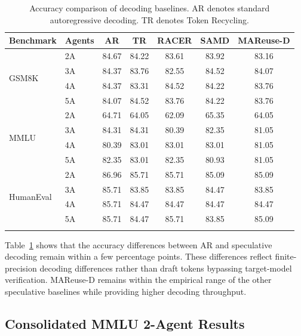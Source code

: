 \documentclass[letterpaper]{article} %
\newcommand{\thickhline}{\noalign{\hrule height 0.8pt}}
\begin{document}
\begin{table}[h]
\centering
\small
\setlength{\tabcolsep}{1.8pt}
\begin{tabular}{llccccc}
\thickhline
\textbf{Benchmark} & \textbf{Agents} & \textbf{AR} & \textbf{TR} & \textbf{RACER} & \textbf{SAMD} & \textbf{MAReuse-D} \\
\hline
\multirow{4}{*}{GSM8K}  & 2A & 84.67 & 84.22 & 83.61 & 83.92 & 83.16 \\
 & 3A & 84.37 & 83.76 & 82.55 & 84.52 & 84.07 \\
 & 4A & 84.37 & 83.31 & 84.52 & 84.22 & 83.76 \\
 & 5A & 84.07 & 84.52 & 83.76 & 84.22 & 83.76 \\
\hline
\multirow{4}{*}{MMLU} & 2A & 64.71 & 64.05 & 62.09 & 65.35 & 64.05 \\
 & 3A & 84.31 & 84.31 & 80.39 & 82.35 & 81.05 \\
 & 4A & 80.39 & 83.01 & 83.01 & 83.01 & 81.05 \\
 & 5A & 82.35 & 83.01 & 82.35 & 80.93 & 81.05 \\
\hline
\multirow{4}{*}{HumanEval} & 2A & 86.96 & 85.71 & 85.71 & 85.09 & 85.09 \\
 & 3A & 85.71 & 83.85 & 83.85 & 84.47 & 83.85 \\
 & 4A & 85.71 & 84.47 & 84.47 & 84.47 & 84.47 \\
 & 5A & 85.71 & 84.47 & 85.71 & 83.85 & 85.09 \\
\thickhline
\end{tabular}
\caption{Accuracy comparison of decoding baselines. AR denotes standard autoregressive decoding. TR denotes Token Recycling.}
\label{tab:decoding-accuracy-consistency}
\end{table}

Table~\ref{tab:decoding-accuracy-consistency} shows that the accuracy differences
between AR and speculative decoding remain within a few percentage points.
These differences reflect finite-precision decoding differences rather than
draft tokens bypassing target-model verification. MAReuse-D remains within the
empirical range of the other speculative baselines while providing higher
decoding throughput.

\subsection{Consolidated MMLU 2-Agent Results}
\end{document}
